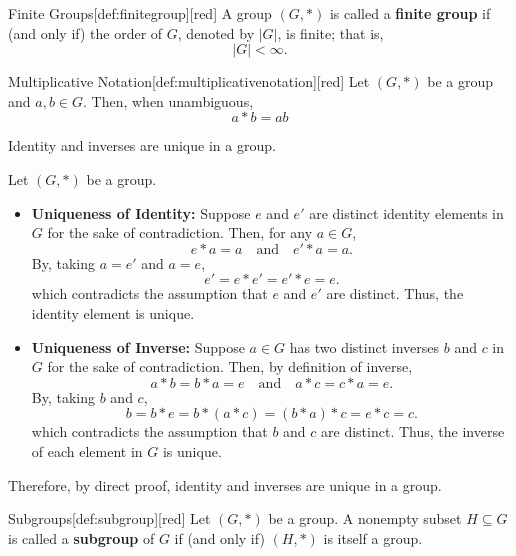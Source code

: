 \begin{define}{Finite Groups}[def:finitegroup][red]
  A group \((G, *)\) is called a \textbf{finite group} if (and only if) 
  the order of \(G\), denoted by \(|G|\), is finite; that is,
  \[
  |G| < \infty.
  \]
\end{define}


\begin{define}{Multiplicative Notation}[def:multiplicativenotation][red]
  Let $(G, *)$ be a group and $a,b\in G$. Then, when unambiguous, 
  \[
    a * b = ab
  \]
\end{define}


\begin{claim}
  Identity and inverses are unique in a group.
  \begin{subprove}
    Let \((G, *)\) be a group.
    \begin{itemize}
      \item \textbf{Uniqueness of Identity:} 
      Suppose \(e\) and \(e'\) are distinct identity elements in \(G\) 
      for the sake of contradiction.
      Then, for any \(a \in G\), 
      \[
      e * a = a \quad \text{and} \quad e' * a = a.
      \]
      By, taking \(a = e'\) and \(a = e\),
      \[
      e' = e * e' = e' * e = e.
      \]
      which contradicts the assumption that \(e\) and \(e'\) are distinct.
      Thus, the identity element is unique.
      \item \textbf{Uniqueness of Inverse:}
      Suppose \(a \in G\) has two distinct inverses \(b\) and \(c\) in \(G\)
      for the sake of contradiction.
      Then, by definition of inverse,
      \[
      a * b = b * a = e \quad \text{and} \quad a * c = c * a = e.
      \]
      By, taking \(b\) and \(c\),
      \[
      b = b * e = b * (a * c) = (b * a) * c = e * c = c.
      \]
      which contradicts the assumption that \(b\) and \(c\) are distinct.
      Thus, the inverse of each element in \(G\) is unique.
    \end{itemize}
    Therefore, by direct proof, identity and inverses are unique in a group.
  \end{subprove}
\end{claim}


\begin{define}{Subgroups}[def:subgroup][red]
  Let \((G, *)\) be a group. A nonempty subset \(H \subseteq G\) is 
  called a \textbf{subgroup} of \(G\) if (and only if) \((H, *)\) is itself a group.
\end{define}


